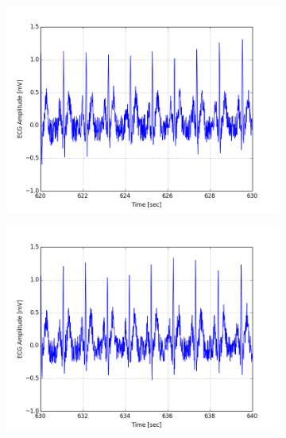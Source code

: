 \documentclass[paper=a4, fontsize=11pt]{scrartcl}
\numberwithin{equation}{section}		%
\numberwithin{figure}{section}			%
\numberwithin{table}{section}		    %
\begin{document}
\begin{appendices}
\begin{figure}[H]
	\centering
	\begin{subfigure}[b]{0.3\textwidth}
		\includegraphics[width=\textwidth]{sim/ecg_16}
	\end{subfigure}
	\begin{subfigure}[b]{0.3\textwidth}
		\includegraphics[width=\textwidth]{sim/ecg_17}
	\end{subfigure}
	\begin{subfigure}[b]{0.3\textwidth}

\end{subfigure}
\end{figure}
\end{appendices}
\end{document}
